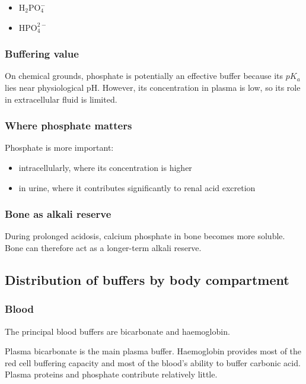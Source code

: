 \documentclass[11pt,a4paper]{article}
\begin{document}
\begin{itemize}
    \item \( \mathrm{H_2PO_4^-} \)
    \item \( \mathrm{HPO_4^{2-}} \)
\end{itemize}

\subsubsection{Buffering value}

On chemical grounds, phosphate is potentially an effective buffer because its \(pK_a\) lies near physiological pH. However, its concentration in plasma is low, so its role in extracellular fluid is limited.

\subsubsection{Where phosphate matters}

Phosphate is more important:

\begin{itemize}
    \item intracellularly, where its concentration is higher
    \item in urine, where it contributes significantly to renal acid excretion
\end{itemize}

\subsubsection{Bone as alkali reserve}

During prolonged acidosis, calcium phosphate in bone becomes more soluble. Bone can therefore act as a longer-term alkali reserve.

\subsection{Distribution of buffers by body compartment}

\subsubsection{Blood}

The principal blood buffers are bicarbonate and haemoglobin.

Plasma bicarbonate is the main plasma buffer. Haemoglobin provides most of the red cell buffering capacity and most of the blood's ability to buffer carbonic acid. Plasma proteins and phosphate contribute relatively little.
\end{document}
